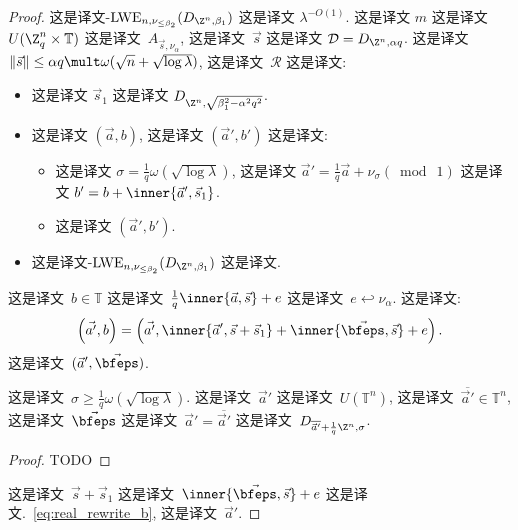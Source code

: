 \begin{proof}
这是译文-$\text{LWE}_{n,\nu_{\leq \beta_2}}(D_{\Z^n, \beta_1})$ 这是译文 $\lambda^{-O(1)}$. 这是译文 $m$ 这是译文~$U(\Z_q^n \times \mathbb{T})$ 这是译文~$A_{\vec{s},\nu_{ \alpha}}$,  这是译文~$\vec{s}$ 这是译文 $\mathcal{D}= D_{\Z^n,\alpha q}$. 这是译文 $ \Vert \vec{s} \Vert \leq \alpha q \mult \omega(\sqrt{n} + \sqrt{\log \lambda})$, 这是译文~$\mathcal{R}$ 这是译文: 
 
 \begin{itemize}
\item[$\bullet$] 这是译文 $\vec{s}_1$ 这是译文 $D_{\Z^n, \sqrt{\beta_1^2 - \alpha^2 q^2} }$.
\item[$\bullet$] 这是译文 $(\vec{a},b)$, 这是译文 $(\vec{a}',b')$ 这是译文:
\begin{itemize}
\item[$\bullet$] 这是译文 $\sigma = \frac{1}{q} \omega (\sqrt{ \log \lambda })$, 这是译文 $\vec{a}' = \frac{1}{q} \vec{a} + \nu_{\sigma} (\bmod~1)$ 这是译文 $b' = b + \inner{\vec{a}', \vec{s}_1}$.
\item[$\bullet$] 这是译文 $(\vec{a}',b')$.
\end{itemize}
\item[$\bullet$] 这是译文-$\text{LWE}_{n,\nu_{\leq \beta_2}}(D_{\Z^n, \beta_1})$ 这是译文.
\end{itemize} 这是译文~$b \in \mathbb{T}$ 这是译文~$\frac{1}{q}
\inner{\vec{a},\vec{s}}+ e$ 这是译文~$e \hookleftarrow \nu_{\alpha}$. 这是译文: \begin{equation}
\label{eq:real_rewrite_b}
\left(\vec{a'}, b\right) = 
\left(
\vec{a'}, \inner{\vec{a}',\vec{s} + \vec{s}_1} +  \inner{\vec{\bfeps},\vec{s}} + e  \right).  
\end{equation} 这是译文~$(\vec{a}',\vec{\bfeps})$.  

\begin{claim}
\label{cl:real_left_size} 这是译文~$\sigma \geq \frac{1}{q}\omega(\sqrt{\log \lambda})$. 这是译文~$\vec{a}'$ 这是译文~$U(\mathbb{T}^n)$, 这是译文~$\overline{\vec{a}'} \in \mathbb{T}^n$, 这是译文~$\vec{\bfeps}$ 这是译文~$\vec{a}' =
  \overline{\vec{a}'}$ 这是译文~$D_{ \overline{\vec{a}'} + \frac{1}{q} \Z^n,\sigma}$.
\end{claim}


\begin{proof}
TODO
\end{proof}

这是译文~$\vec{s} + \vec{s}_1$ 这是译文~$\inner{\vec{\bfeps},\vec{s}} + e $ 这是译文.~\eqref{eq:real_rewrite_b}, 这是译文~$\vec{a}'$.


\end{proof}
